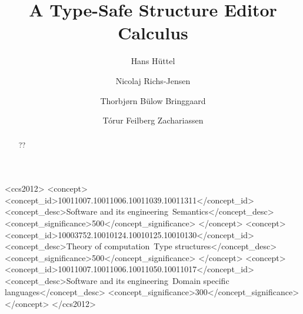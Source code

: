 \documentclass[sigplan,screen]{acmart}
\begin{document}

%
\title{A Type-Safe Structure Editor Calculus}
%
%



\author{Hans Hüttel}

  
\author{Nicolaj Richs-Jensen}


\author{Thorbjørn Bülow Bringgaard}


\author{Tórur Feilberg Zachariassen}

  

%
%
%

%
 \begin{abstract}
??
\end{abstract}

\begin{CCSXML}
<ccs2012>
<concept>
<concept_id>10011007.10011006.10011039.10011311</concept_id>
<concept_desc>Software and its engineering~Semantics</concept_desc>
<concept_significance>500</concept_significance>
</concept>
<concept>
<concept_id>10003752.10010124.10010125.10010130</concept_id>
<concept_desc>Theory of computation~Type structures</concept_desc>
<concept_significance>500</concept_significance>
</concept>
<concept>
<concept_id>10011007.10011006.10011050.10011017</concept_id>
<concept_desc>Software and its engineering~Domain specific languages</concept_desc>
<concept_significance>300</concept_significance>
</concept>
</ccs2012>
\end{CCSXML}
\end{document}
